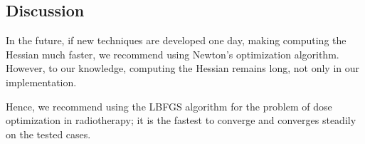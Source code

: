 \subsection{Discussion}
In the future, if new techniques are developed one day, making computing the Hessian much faster, we recommend using Newton's optimization algorithm.
However, to our knowledge, computing the Hessian remains long, not only in our implementation.

Hence, we recommend using the LBFGS algorithm for the problem of dose optimization in radiotherapy;
it is the fastest to converge and converges steadily on the tested cases.
